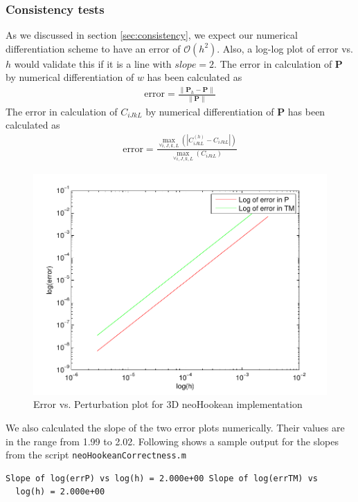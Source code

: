 \message{ !name(p1_2.tex)}\documentclass[../main.tex]{subfiles}
\begin{document}
\subsubsection{Consistency tests}
As we discussed in section \ref{sec:consistency}, we expect our
numerical differentiation scheme to have an error of
$\mathcal{O}(h^2)$. Also, a log-log plot of $\text{error}$ vs. $h$
would validate this if it is a line with $slope=2$. The error in
calculation of $\mathbf{P}$ by numerical differentiation of $w$ has
been calculated as
\begin{align*}
  \text{error} = \frac{\lVert\mathbf{P}_h - \mathbf{P}\rVert}{\lVert\mathbf{P}\rVert}
\end{align*}
The error in calculation of $C_{iJkL}$ by numerical differentiation of
$\mathbf{P}$ has been calculated as
\begin{align*}
  \text{error} =\frac{\underset{\forall i,J,k,L}{\max}\left(|C^{(h)}_{iJkL}-C_{iJkL}|\right)}{\underset{\forall i,J,k,L}{\max}\left(C_{iJkL}\right)}
\end{align*}
\begin{figure}[h]
  \centering
  \includegraphics{./img/neoHookConsistency.pdf}
  \caption{Error vs. Perturbation plot for 3D neoHookean
    implementation}
  \label{fig:neoHcon}
\end{figure}
We also calculated the slope of the two error plots numerically. Their
values are in the range from 1.99 to 2.02. Following shows a sample
output for the slopes from the script \texttt{neoHookeanCorrectness.m}
\begin{lstlisting}[frame=single]
  Slope of log(errP) vs log(h) = 2.000e+00 Slope of log(errTM) vs
  log(h) = 2.000e+00
\end{lstlisting}
\end{document}
